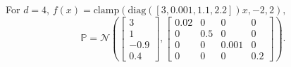 \documentclass[11pt, a4paper, oneside,reqno]{amsart}
\theoremstyle{plain}
\def\prob{\mathbb{P}}
\def\sN{{\mathcal{N}}}
\begin{document}
For $d=4$, $f(x) = \text{clamp}(\text{diag}([3, 0.001, 1.1, 2.2])x, -2, 2),$ $$\prob = \sN\left(\begin{bmatrix}3 \\1\\-0.9\\0.4\end{bmatrix}, \begin{bmatrix}0.02 & 0 &0&0 \\0 & 0.5&0&0 \\0&0&0.001&0 \\ 0&0&0&0.2 \end{bmatrix}\right).$$


\clearpage
\begin{small}

\end{small}
\end{document}
